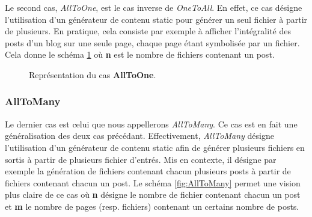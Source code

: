 			Le second cas, \textit{AllToOne}, est le cas inverse de \textit{OneToAll}. En effet, ce cas désigne l'utilisation d'un générateur de contenu static pour générer un seul fichier à partir de plusieurs. En pratique, cela consiste par exemple à afficher l'intégralité des posts d'un blog sur une seule page, chaque page étant symbolisée par un fichier. Cela donne le schéma \ref{fig:AllToOne} où \textbf{n} est le nombre de fichiers contenant un post.
		
			\begin{figure}
				\begin{center}
					\caption{Représentation du cas \textbf{AllToOne}.}
					\label{fig:AllToOne}
				\end{center}
			\end{figure}
			
		\subsubsection*{AllToMany}
			
			Le dernier cas est celui que nous appellerons \textit{AllToMany}. Ce cas est en fait une généralisation des deux cas précédant. Effectivement, \textit{AllToMany} désigne l'utilisation d'un générateur de contenu static afin de générer plusieurs fichiers en sortis à partir de plusieurs fichier d'entrés. Mis en contexte, il désigne par exemple la génération de fichiers contenant chacun plusieurs posts à partir de fichiers contenant chacun un post. Le schéma \ref{fig:AllToMany} permet une vision plus claire de ce cas où \textbf{n} désigne le nombre de fichier contenant chacun un post et \textbf{m} le nombre de pages (resp. fichiers) contenant un certains nombre de posts.\\
			
